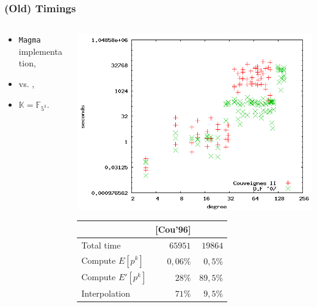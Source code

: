 \documentclass[10pt]{beamer}
\newcommand{\K}{\mathbb{K}}  %
\newcommand{\F}{\mathbb{F}}  %
\newcommand{\0}{\mathcal{O}}  %
\begin{document}
\begin{frame}
  \frametitle{(Old) Timings}

  \begin{columns}
    \begin{column}{0.4\textwidth}
      \begin{itemize}
      \item \texttt{Magma} implementation,
      \item \cite{Cou96} vs. \cite{DF07},
      \item $\K = \F_{5^3}$.
      \end{itemize}
    \end{column}
    \begin{column}{0.6\textwidth}
      \includegraphics[width=\textwidth]{5}

      \smallskip
      \footnotesize
      \centering
      \begin{tabular}{|l|r|r|}
        \hline
        & [Cou'96] & \cite{DF07}\\
        \hline
        
        Total time           &  $65951$ & $19864$\\
        Compute $E[p^k]$    &           $0,06$\% & $0,5$\%\\
        Compute $E'[p^k]$   &             $28$\% & $89,5$\%\\
        Interpolation &             $71$\% & $9,5$\%\\
        \hline
      \end{tabular}
    \end{column}
  \end{columns}
\end{frame}
\end{document}
